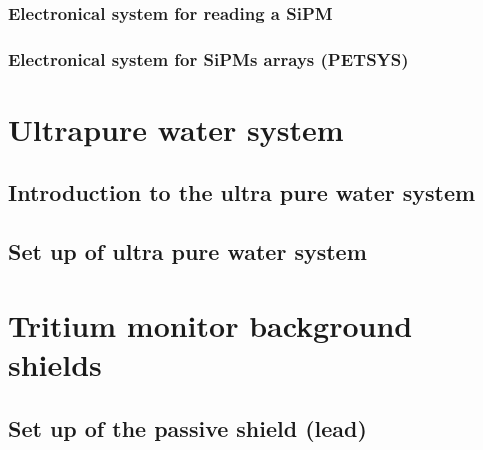 \documentclass[12pt,a4paper]{book}
\begin{document}
			\subsubsection[Electronical system for a SiPM]{Electronical system for reading a SiPM }
			\label{subsubsec:SiPMElectronicalSystem}
			
			\subsubsection[PETSYS (SiPMs)]{Electronical system for SiPMs arrays (PETSYS) }
			\label{subsubsec:PETSYS}
			\newpage		
		
	\section{Ultrapure water system}\label{sec:UltraPureWaterSystem}
		
		\subsection[Introduction water system]{Introduction to the ultra pure water system}
		 \label{subsec:IntroductionWaterSystem}
					
		\subsection[Set up water system]{Set up of ultra pure water system} %
		\label{subsec:SetUpWaterSystem}
		\newpage	
	
	\section[Background shields]{Tritium monitor background shields}\label{sec:BackgroundShields}
	
		\subsection[Set up passive shield]{Set up of the passive shield (lead)} %
		\label{subsec:SetUpPassiveShield}
		
\end{document}
